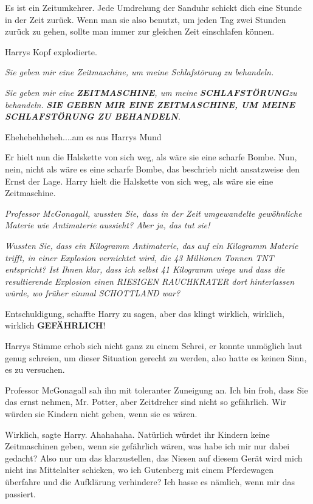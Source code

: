 \glqq Es ist ein Zeitumkehrer. Jede Umdrehung der Sanduhr schickt dich eine
Stunde in der Zeit zurück. Wenn man sie also benutzt, um jeden Tag zwei Stunden
zurück zu gehen, sollte man immer zur gleichen Zeit einschlafen können.\grqq{}

Harrys Kopf explodierte.

\emph{Sie geben mir eine Zeitmaschine, um meine Schlafstörung zu behandeln.}

\emph{Sie geben mir eine }\textbf{\emph{ZEITMASCHINE}}\emph{, um meine
}\textbf{\emph{SCHLAFSTÖRUNG}}\emph{zu behandeln.} \emph{}\textbf{\emph{SIE
GEBEN MIR EINE ZEITMASCHINE, UM MEINE SCHLAFSTÖRUNG ZU BEHANDELN}}\emph{.}

\glqq Ehehehehheheh...\grqq{}.am es aus Harrys Mund

Er hielt nun die Halskette von sich weg, als wäre sie eine scharfe Bombe. Nun,
nein, nicht als wäre es eine scharfe Bombe, das beschrieb nicht ansatzweise den
Ernst der Lage. Harry hielt die Halskette von sich weg, als wäre sie eine
Zeitmaschine.

\emph{Professor McGonagall, wussten Sie, dass in der Zeit umgewandelte
gewöhnliche Materie wie Antimaterie aussieht? Aber ja, das tut sie!}

\emph{Wussten Sie, dass ein Kilogramm Antimaterie, das auf ein Kilogramm
Materie trifft, in einer Explosion vernichtet wird, die 43 Millionen Tonnen TNT
entspricht? Ist Ihnen klar, dass ich selbst 41 Kilogramm wiege und dass die
resultierende Explosion einen RIESIGEN RAUCHKRATER dort hinterlassen würde, wo
früher einmal SCHOTTLAND war?}

\glqq Entschuldigung\grqq{}, schaffte Harry zu sagen, \glqq aber das klingt
wirklich, wirklich, wirklich \textbf{GEFÄHRLICH}!\grqq{}

Harrys Stimme erhob sich nicht ganz zu einem Schrei, er konnte unmöglich laut
genug schreien, um dieser Situation gerecht zu werden, also hatte es keinen
Sinn, es zu versuchen.

Professor McGonagall sah ihn mit toleranter Zuneigung an. \glqq Ich bin froh,
dass Sie das ernst nehmen, Mr. Potter, aber Zeitdreher sind nicht so gefährlich.
Wir würden sie Kindern nicht geben, wenn sie es wären.\grqq{}

\glqq Wirklich\grqq{}, sagte Harry. \glqq Ahahahaha. Natürlich würdet ihr
Kindern keine Zeitmaschinen geben, wenn sie gefährlich wären, was habe ich mir
nur dabei gedacht? Also nur um das klarzustellen, das Niesen auf diesem Gerät
wird mich nicht ins Mittelalter schicken, wo ich Gutenberg mit einem Pferdewagen
überfahre und die Aufklärung verhindere? Ich hasse es nämlich, wenn mir das
passiert.\grqq{}

